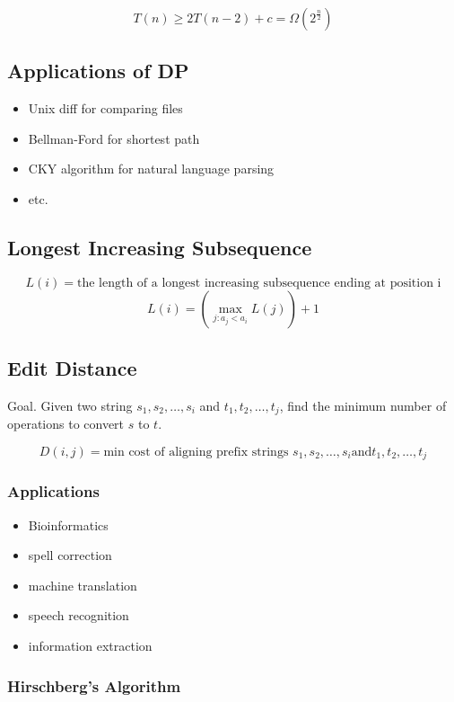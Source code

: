\documentclass[12pt,a4paper]{article}
\begin{document}
\[T(n) \geq 2T(n-2) + c = \Omega(2^{\frac{n}{2}})\]



\subsection*{Applications of DP}

\begin{itemize}
  \item Unix diff for comparing files
  \item Bellman-Ford for shortest path
  \item CKY algorithm for natural language parsing
  \item etc.
\end{itemize}

\subsection*{Longest Increasing Subsequence}

\[L(i) = \text{the length of a longest increasing subsequence ending at position i}\]
\[L(i) = (\max_{j:a_j < a_i}{L(j)})+1\]

\subsection*{Edit Distance}

Goal. Given two string $s_1, s_2, \dots, s_i$ and $t_1, t_2, \dots, t_j$, find the minimum number of operations to convert $s$ to $t$.

\[D(i, j) = \text{min cost of aligning prefix strings } s_1,s_2,\dots,s_i \text{and} t_1,t_2,\dots,t_j\]

\subsubsection{Applications}

\begin{itemize}
    \item Bioinformatics
    \item spell correction
    \item machine translation
    \item speech recognition
    \item information extraction
\end{itemize}

\subsubsection*{Hirschberg's Algorithm}
\end{document}
